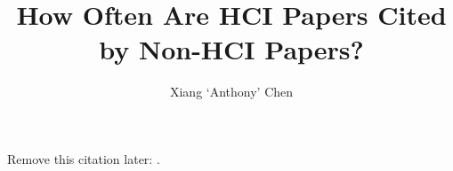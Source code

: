 \documentclass[sigconf]{acmart}
\begin{document}
\title{How Often Are HCI Papers Cited by Non-HCI Papers?}

\author{Xiang `Anthony' Chen}

\renewcommand{\shortauthors}{Chen}



\begin{abstract}
  
\end{abstract}





\maketitle





% 
% 
% 
% 

Remove this citation later: \cite{bush1945we}.



\end{document}
